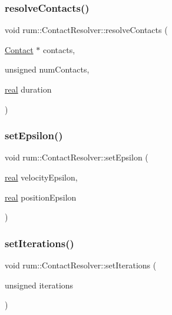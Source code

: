 \mbox{\label{classrum_1_1_contact_resolver_a153040b39293571645cd24ab2dfb763a}} 
\subsubsection{\texorpdfstring{resolve\+Contacts()}{resolveContacts()}}
{\footnotesize\ttfamily void rum\+::\+Contact\+Resolver\+::resolve\+Contacts (\begin{DoxyParamCaption}\item[{\hyperlink{classrum_1_1_contact}{Contact} $\ast$}]{contacts,  }\item[{unsigned}]{num\+Contacts,  }\item[{\hyperlink{namespacerum_a7e8cca23573d5eaead0f138cbaa4862c}{real}}]{duration }\end{DoxyParamCaption})}

\mbox{\label{classrum_1_1_contact_resolver_a6dd5b9d5e4057068fd96fff89a607bcc}} 
\subsubsection{\texorpdfstring{set\+Epsilon()}{setEpsilon()}}
{\footnotesize\ttfamily void rum\+::\+Contact\+Resolver\+::set\+Epsilon (\begin{DoxyParamCaption}\item[{\hyperlink{namespacerum_a7e8cca23573d5eaead0f138cbaa4862c}{real}}]{velocity\+Epsilon,  }\item[{\hyperlink{namespacerum_a7e8cca23573d5eaead0f138cbaa4862c}{real}}]{position\+Epsilon }\end{DoxyParamCaption})}

\mbox{\label{classrum_1_1_contact_resolver_a22500b8327332e7c95c100aa30160ff8}} 
\subsubsection{\texorpdfstring{set\+Iterations()}{setIterations()}\hspace{0.1cm}{\footnotesize\ttfamily [1/2]}}
{\footnotesize\ttfamily void rum\+::\+Contact\+Resolver\+::set\+Iterations (\begin{DoxyParamCaption}\item[{unsigned}]{iterations }\end{DoxyParamCaption})}


